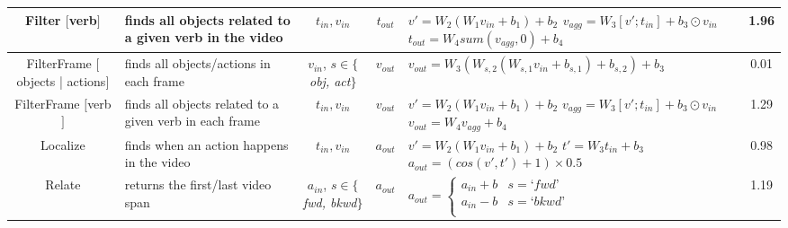\documentclass[letterpaper]{article} %
\begin{document}
\begin{table}[t]
{\begin{tabular}{cm{4cm}cclc}
        \makecell[c]{Filter \\ $[$verb$]$} & finds all objects related to a given verb in the video & $t_{in}, v_{in}$ & $t_{out}$ & 
            \makecell[l]{
                $v'=W_2(W_1v_{in}+b_1)+b_2$ \\
                $v_{agg}=W_3[v';t_{in}]+b_3 \odot v_{in}$ \\
                $t_{out}=W_4sum(v_{agg},0)+b_4$
            } & 1.96 \\
        \hline
        
        \makecell[c]{FilterFrame \\ $[$objects | actions$]$} & finds all objects/actions in each frame & \makecell[c]{$v_{in}$, \\ $s \in \{$\textit{obj, act}$\}$} & $v_{out}$ & $v_{out}=W_3(W_{s,2}(W_{s,1}v_{in}+b_{s,1})+b_{s,2})+b_3$ & 0.01 \\
        \hline
        
        \makecell[c]{FilterFrame \\ $[$verb$]$} & finds all objects related to a given verb in each frame & $t_{in}, v_{in}$ & $v_{out}$ &
            \makecell[l]{
                $v'=W_2(W_1v_{in}+b_1)+b_2$ \\
                $v_{agg}=W_3[v';t_{in}]+b_3 \odot v_{in}$ \\ 
                $v_{out}=W_4v_{agg}+b_4$
            } & 1.29 \\
        \hline
        
        Localize & finds when an action happens in the video & $t_{in}, v_{in}$ & $a_{out}$ &
            \makecell[l]{
                $v'=W_2(W_1v_{in}+b_1)+b_2$ \\ 
                $t'=W_3t_{in}+b_3$ \\
                $a_{out} = (cos(v',t') + 1) \times 0.5 $
            } & 0.98 \\
        \hline

        Relate & returns the first/last video span & \makecell[c]{$a_{in}$, \\ $s \in \{$\textit{fwd, bkwd}$\}$} & $a_{out}$ & 
            $ a_{out}=\begin{cases}
                a_{in} + b & s=\textit{`fwd'} \\
                a_{in} - b & s=\textit{`bkwd'} \\
            \end{cases} $ & 1.19 \\
        \hline
        

\end{tabular}}
\end{table}
\end{document}
